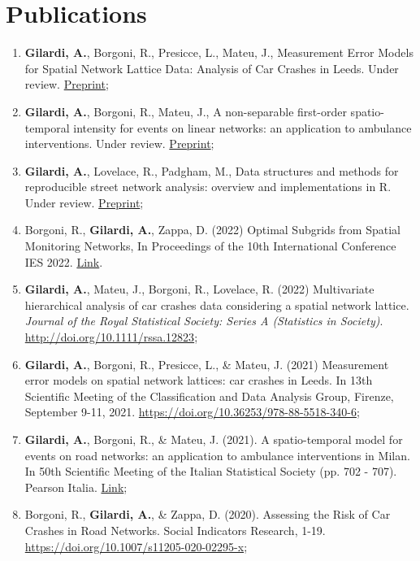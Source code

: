 \documentclass[11pt,a4paper,sans]{moderncv}
\begin{document}
  \section{Publications}
  \begin{enumerate}
  	\item \textbf{Gilardi, A.}, Borgoni, R., Presicce, L., Mateu, J., Measurement Error Models for Spatial Network Lattice Data: Analysis of Car Crashes in Leeds. Under review. \href{https://arxiv.org/pdf/2201.02394.pdf}{Preprint};
  \item \textbf{Gilardi, A.}, Borgoni, R., Mateu, J., A non-separable first-order spatio-temporal intensity for events on linear networks: an application to ambulance interventions. Under review. \href{https://arxiv.org/abs/2106.00457}{Preprint};    
  \item \textbf{Gilardi, A.}, Lovelace, R., Padgham, M., Data structures and methods for reproducible street network analysis: overview and implementations in R. Under review. \href{https://osf.io/78yub}{Preprint};
  \item Borgoni, R., \textbf{Gilardi, A.}, Zappa, D. (2022) Optimal Subgrids from Spatial Monitoring Networks, In Proceedings of the 10th International Conference IES 2022. \href{https://drive.google.com/file/d/1HEZG50lecMyx_NDRLi2Y7d0papiX9ZWO/view}{Link}.
  \item \textbf{Gilardi, A.}, Mateu, J., Borgoni, R., Lovelace, R. (2022) Multivariate hierarchical analysis of car crashes data considering a spatial network lattice. \textit{Journal of the Royal Statistical Society: Series A (Statistics in Society)}. \url{ http://doi.org/10.1111/rssa.12823};
  \item \textbf{Gilardi, A.}, Borgoni, R., Presicce, L., \& Mateu, J. (2021) Measurement error models on spatial network lattices: car crashes in Leeds. In 13th Scientific Meeting of the Classification and Data Analysis Group, Firenze, September 9-11, 2021. \url{https://doi.org/10.36253/978-88-5518-340-6}; 
  \item \textbf{Gilardi, A.}, Borgoni, R., \& Mateu, J. (2021). A spatio-temporal model for events on road networks: an application to ambulance interventions in Milan. In 50th Scientific Meeting of the Italian Statistical Society (pp. 702 - 707). Pearson Italia. \href{https://it.pearson.com/content/dam/region-core/italy/pearson-italy/pdf/Docenti/Universit%C3%A0/pearson-sis-book-2021-parte-1.pdf}{Link}; 
  \item Borgoni, R., \textbf{Gilardi, A.}, \& Zappa, D. (2020). Assessing the Risk of Car Crashes in Road Networks. Social Indicators Research, 1-19. \url{https://doi.org/10.1007/s11205-020-02295-x};

\end{enumerate}
\end{document}
